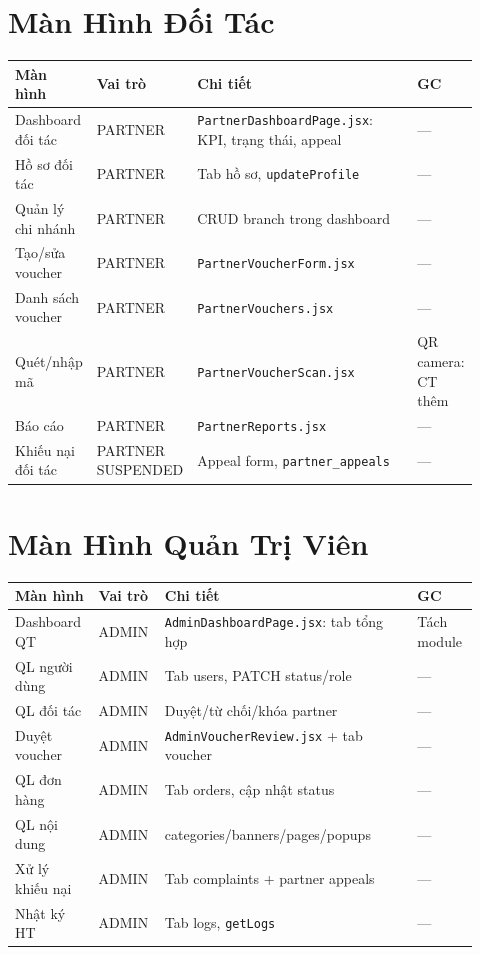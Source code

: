 \section{Màn Hình Đối Tác}
\small
\begin{longtable}{>{\raggedright\arraybackslash}p{0.16\linewidth}>{\raggedright\arraybackslash}p{0.12\linewidth}>{\raggedright\arraybackslash}p{0.52\linewidth}>{\raggedright\arraybackslash}p{0.12\linewidth}}
\toprule
\textbf{Màn hình} & \textbf{Vai trò} & \textbf{Chi tiết} & \textbf{GC}\\
\midrule
Dashboard đối tác & PARTNER & \texttt{PartnerDashboardPage.jsx}: KPI, trạng thái, appeal & —\\
Hồ sơ đối tác & PARTNER & Tab hồ sơ, \texttt{updateProfile} & —\\
Quản lý chi nhánh & PARTNER & CRUD branch trong dashboard & —\\
Tạo/sửa voucher & PARTNER & \texttt{PartnerVoucherForm.jsx} & —\\
Danh sách voucher & PARTNER & \texttt{PartnerVouchers.jsx} & —\\
Quét/nhập mã & PARTNER & \texttt{PartnerVoucherScan.jsx} & QR camera: CT thêm\\
Báo cáo & PARTNER & \texttt{PartnerReports.jsx} & —\\
Khiếu nại đối tác & PARTNER SUSPENDED & Appeal form, \texttt{partner\_appeals} & —\\
\bottomrule
\end{longtable}
\normalsize

\section{Màn Hình Quản Trị Viên}
\small
\begin{longtable}{>{\raggedright\arraybackslash}p{0.16\linewidth}>{\raggedright\arraybackslash}p{0.12\linewidth}>{\raggedright\arraybackslash}p{0.52\linewidth}>{\raggedright\arraybackslash}p{0.12\linewidth}}
\toprule
\textbf{Màn hình} & \textbf{Vai trò} & \textbf{Chi tiết} & \textbf{GC}\\
\midrule
Dashboard QT & ADMIN & \texttt{AdminDashboardPage.jsx}: tab tổng hợp & Tách module\\
QL người dùng & ADMIN & Tab users, PATCH status/role & —\\
QL đối tác & ADMIN & Duyệt/từ chối/khóa partner & —\\
Duyệt voucher & ADMIN & \texttt{AdminVoucherReview.jsx} + tab voucher & —\\
QL đơn hàng & ADMIN & Tab orders, cập nhật status & —\\
QL nội dung & ADMIN & categories/banners/pages/popups & —\\
Xử lý khiếu nại & ADMIN & Tab complaints + partner appeals & —\\
Nhật ký HT & ADMIN & Tab logs, \texttt{getLogs} & —\\
\bottomrule
\end{longtable}
\normalsize

